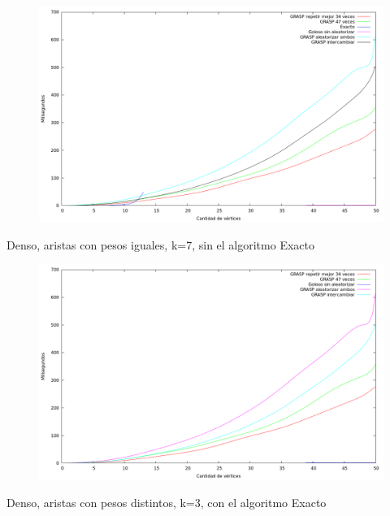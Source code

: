 \begin{figure}[H]
  \begin{center}
    \includegraphics[scale=0.35]{imagenes/ej6-denso-pesos-iguales-k7-tiempo-exacto.png}
  \end{center}
\end{figure}

Denso, aristas con pesos iguales, k=7, sin el algoritmo Exacto

\begin{figure}[H]
  \begin{center}
    \includegraphics[scale=0.35]{imagenes/ej6-denso-pesos-iguales-k7-tiempo.png}
  \end{center}
\end{figure}

Denso, aristas con pesos distintos, k=3, con el algoritmo Exacto

